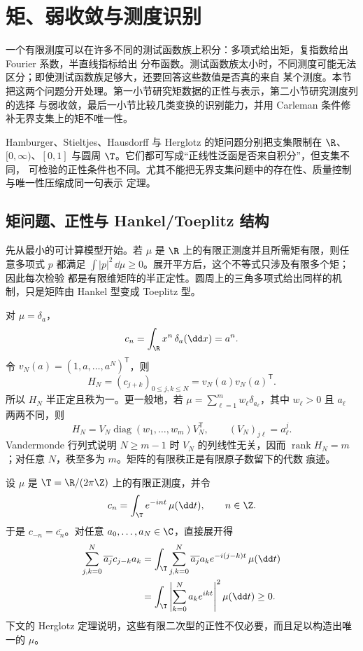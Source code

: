 \section{矩、弱收敛与测度识别}\label{sec:07-03}

一个有限测度可以在许多不同的测试函数族上积分：多项式给出矩，复指数给出 Fourier 系数，半直线指标给出
分布函数。测试函数族太小时，不同测度可能无法区分；即使测试函数族足够大，还要回答这些数值是否真的来自
某个测度。本节把这两个问题分开处理。第一小节研究矩数据的正性与表示，第二小节研究测度列的选择
与弱收敛，最后一小节比较几类变换的识别能力，并用 Carleman 条件修补无界支集上的矩不唯一性。

Hamburger、Stieltjes、Hausdorff 与 Herglotz 的矩问题分别把支集限制在
$\R$、$[0,\infty)$、$[0,1]$ 与圆周 $\T$。它们都可写成“正线性泛函是否来自积分”，但支集不同，
可检验的正性条件也不同。尤其不能把无界支集问题中的存在性、质量控制与唯一性压缩成同一句表示
定理。

\subsection{矩问题、正性与 Hankel/Toeplitz 结构}\label{subsec:7-3-1}

先从最小的可计算模型开始。若 $\mu$ 是 $\R$ 上的有限正测度并且所需矩有限，则任意多项式
$p$ 都满足 $\int |p|^2\,\dd\mu\geq0$。展开平方后，这个不等式只涉及有限多个矩；因此每次检验
都是有限维矩阵的半正定性。圆周上的三角多项式给出同样的机制，只是矩阵由 Hankel 型变成
Toeplitz 型。

\begin{example}[Dirac 矩]\label{ex:7-3-1-1}
对 $\mu=\delta_a$，
\[
 c_n=\int_\R x^n\,\delta_a(\dd x)=a^n.
\]
令 $v_N(a)=(1,a,\ldots,a^N)^{\mathsf T}$，则
\[
 H_N=(c_{j+k})_{0\leq j,k\leq N}
     =v_N(a)v_N(a)^{\mathsf T}.
\]
所以 $H_N$ 半正定且秩为一。更一般地，若
$\mu=\sum_{\ell=1}^m w_\ell\delta_{a_\ell}$，其中 $w_\ell>0$ 且 $a_\ell$ 两两不同，则
\[
 H_N=V_N\operatorname{diag}(w_1,\ldots,w_m)V_N^{\mathsf T},
 \qquad (V_N)_{j\ell}=a_\ell^j.
\]
Vandermonde 行列式说明 $N\geq m-1$ 时 $V_N$ 的列线性无关，因而
$\operatorname{rank}H_N=m$；对任意 $N$，秩至多为 $m$。矩阵的有限秩正是有限原子数留下的代数
痕迹。
\end{example}

\begin{example}[圆周正定序列]\label{ex:7-3-1-2}
设 $\mu$ 是 $\T=\R/(2\pi\Z)$ 上的有限正测度，并令
\[
 c_n=\int_\T e^{-int}\,\mu(\dd t),\qquad n\in\Z.
\]
于是 $c_{-n}=\overline{c_n}$。对任意 $a_0,\ldots,a_N\in\C$，直接展开得
\begin{align*}
 \sum_{j,k=0}^N\overline{a_j}c_{j-k}a_k
 &=\int_\T\sum_{j,k=0}^N
   \overline{a_j}a_k e^{-i(j-k)t}\,\mu(\dd t)\\
 &=\int_\T\left|\sum_{k=0}^N a_ke^{ikt}\right|^2\mu(\dd t)\geq0.
\end{align*}
下文的 Herglotz 定理说明，这些有限二次型的正性不仅必要，而且足以构造出唯一的 $\mu$。
\end{example}

